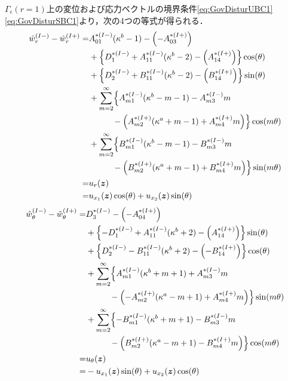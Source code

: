 $\Gamma_{\epsilon}(r=1)$上の変位および応力ベクトルの境界条件\eqref{eq:GovDisturUBC1}\eqref{eq:GovDisturSBC1}より，次の4つの等式が得られる．
\begin{align}
	\hat{w}_{r}^{(I-)}-\hat{w}_{r}^{(I+)} =&A_{01}^{*(I-)}(\kappa^{b}-1)-\Bigl(-A_{03}^{*(I+)}\Bigr)
	\nonumber
	\\
	&+\Bigl\{D_{1}^{*(I-)}+A_{11}^{*(I-)}(\kappa^{b}-2)
	-\Bigl(A_{14}^{*(I+)}\Bigr)\Bigr\}\cos(\theta)
	\nonumber
	\\
	&+\Bigl\{D_{2}^{*(I-)}+B_{11}^{*(I-)}(\kappa^{b}-2)
	-\Bigl(B_{14}^{*(I+)}\Bigr)\Bigr\}\sin(\theta)
	\nonumber
	\\
	&+\sum_{m=2}^{\infty}\Bigl\{A_{m1}^{*(I-)}(\kappa^{b}-m-1)
	-A_{m3}^{*(I-)}m
	\nonumber
	\\
	&\hspace{1.0cm}-\Bigl(A_{m2}^{*(I+)}(\kappa^{a}+m-1)
	+A_{m4}^{*(I+)}m\Bigr)\Bigr\}\cos(m\theta)
	\nonumber
	\\
	&+\sum_{m=2}^{\infty}\Bigl\{B_{m1}^{*(I-)}(\kappa^{b}-m-1)
	-B_{m3}^{*(I-)}m
	\nonumber
	\\
	&\hspace{1.0cm}-\Bigl(B_{m2}^{*(I+)}(\kappa^{a}+m-1)
	+B_{m4}^{*(I+)}m\Bigr)\Bigr\}\sin(m\theta)
	\nonumber
	\\
	=&u_{r}(\bm{z})
	\nonumber
	\\
	=&u_{x_{1}}(\bm{z})\cos(\theta)+u_{x_{2}}(\bm{z})\sin(\theta)
	\label{eq:UR1eq}
\end{align}
\begin{align}
	\hat{w}_{\theta}^{(I-)}-\hat{w}_{\theta}^{(I+)} =&D_{3}^{*(I-)}-\Bigl(-A_{04}^{*(I+)}\Bigr)
	\nonumber
	\\
	&+\Bigl\{-D_{1}^{*(I-)}+A_{11}^{*(I-)}(\kappa^{b}+2)
	-\Bigl(A_{14}^{*(I+)}\Bigr)\Bigr\}\sin(\theta)
	\nonumber
	\\
	&+\Bigl\{D_{2}^{*(I-)}-B_{11}^{*(I-)}(\kappa^{b}+2)
	-\Bigl(-B_{14}^{*(I+)}\Bigr)\Bigr\}\cos(\theta)
	\nonumber
	\\
	&+\sum_{m=2}^{\infty}\Bigl\{A_{m1}^{*(I-)}(\kappa^{b}+m+1)
	+A_{m3}^{*(I-)}m
	\nonumber
	\\
	&\hspace{1.0cm}-\Bigl(-A_{m2}^{*(I+)}(\kappa^{a}-m+1)
	+A_{m4}^{*(I+)}m\Bigr)\Bigr\}\sin(m\theta)
	\nonumber
	\\
	&+\sum_{m=2}^{\infty}\Bigl\{-B_{m1}^{*(I-)}(\kappa^{b}+m+1)
	-B_{m3}^{*(I-)}m
	\nonumber
	\\
	&\hspace{1.0cm}-\Bigl(B_{m2}^{*(I+)}(\kappa^{a}-m+1)
	-B_{m4}^{*(I+)}m\Bigr)\Bigr\}\cos(m\theta)
	\nonumber
	\\
	=&u_{\theta}(\bm{z})
	\nonumber
	\\
	=&-u_{x_{1}}(\bm{z})\sin(\theta)+u_{x_{2}}(\bm{z})\cos(\theta)
	\label{eq:UTh1eq}
\end{align}
